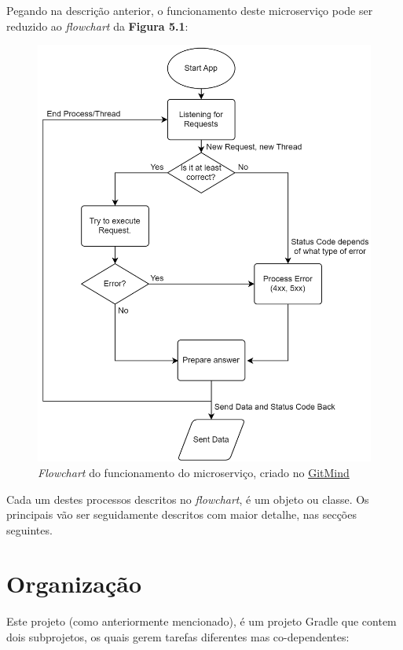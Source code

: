 Pegando na descrição anterior, o funcionamento deste microserviço pode ser reduzido ao \textit{flowchart} da \textbf{Figura 5.1}:

\begin{figure}[!hbt]
  \centering
  \includegraphics[width=14cm]{figuras/flowchart1.png}
  \caption{\textit{Flowchart} do funcionamento do microserviço, criado no \href{https://gitmind.com/app/flowchart/ccd11723910}{GitMind}}
  \label{fig:flow1}
\end{figure}
\FloatBarrier

Cada um destes processos descritos no \textit{flowchart}, é um objeto ou classe. Os principais vão ser seguidamente descritos com maior detalhe, nas secções seguintes.

\newpage

\section{Organização}

Este projeto (como anteriormente mencionado), é um projeto Gradle que contem dois subprojetos, os quais gerem tarefas diferentes mas co-dependentes:

